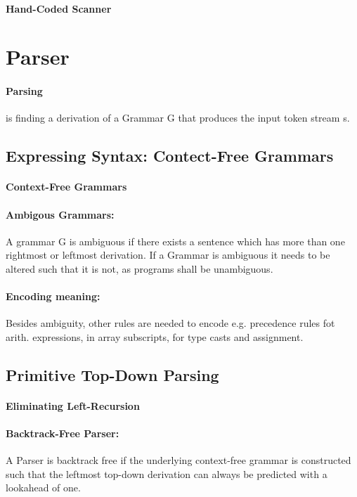 \paragraph{Hand-Coded Scanner}

\section{Parser}
\paragraph{Parsing} is finding a derivation of a Grammar G that produces the input token stream s. 
\subsection{Expressing Syntax: Contect-Free Grammars}
\paragraph{Context-Free Grammars}
\paragraph{Ambigous Grammars:} A grammar G is ambiguous if there exists a sentence which has more than one rightmost or leftmost derivation. If a Grammar is ambiguous it needs to be altered such that it is not, as programs shall be unambiguous. \\
\paragraph{Encoding meaning:} Besides ambiguity, other rules are needed to encode e.g. precedence rules fot arith. expressions, in array subscripts, for type casts and assignment. \\

\subsection{Primitive Top-Down Parsing}
\paragraph{Eliminating Left-Recursion}

\paragraph{Backtrack-Free Parser:} A Parser is backtrack free if the underlying context-free grammar is constructed such that the leftmost top-down derivation can always be predicted with a lookahead of one. \\

